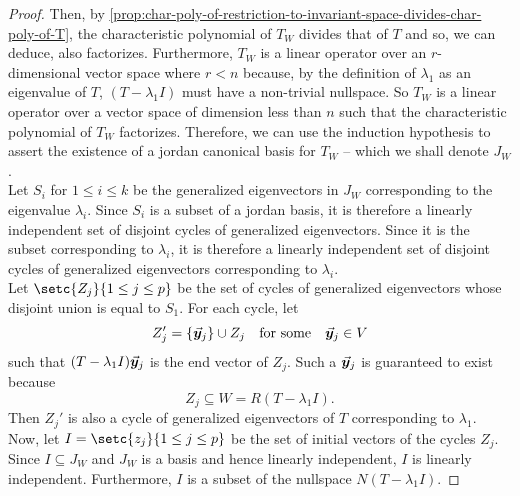 \documentclass[../MathsNotesBase.tex]{subfiles}
\begin{document}
{\begin{proof}
			Then, by \autoref{prop:char-poly-of-restriction-to-invariant-space-divides-char-poly-of-T}, the characteristic polynomial of $T_W$ divides that of $T$ and so, we can deduce, also factorizes. Furthermore, $T_W$ is a linear operator over an $r$-dimensional vector space where ${ r < n }$ because, by the definition of $\lambda_1$ as an eigenvalue of $T$, ${ (T - \lambda_1 I) }$ must have a non-trivial nullspace. So $T_W$ is a linear operator over a vector space of dimension less than $n$ such that the characteristic polynomial of $T_W$ factorizes. Therefore, we can use the induction hypothesis to assert the existence of a jordan canonical basis for $T_W$ -- which we shall denote $J_W$.\\
			
			Let $S_i$ for ${ 1 \leq i \leq k }$ be the generalized eigenvectors in $J_W$ corresponding to the eigenvalue $\lambda_i$. Since $S_i$ is a subset of a jordan basis, it is therefore a linearly independent set of disjoint cycles of generalized eigenvectors. Since it is the subset corresponding to $\lambda_i$, it is therefore a linearly independent set of disjoint cycles of generalized eigenvectors corresponding to $\lambda_i$.\\
			
			Let ${ \setc{Z_j}{1 \leq j \leq p} }$ be the set of cycles of generalized eigenvectors whose disjoint union is equal to $S_1$. For each cycle, let
			\[ Z_j' = \{\vec{\bm{y}}_j\} \cup Z_j \hspace{10pt}\text{for some}\hspace{10pt} \vec{\bm{y}}_j \in V \]
			such that ${ (T - \lambda_1 I)\vec{\bm{y}}_j }$ is the end vector of $Z_j$. Such a $\vec{\bm{y}}_j$ is guaranteed to exist because 
			\[ Z_j \subseteq W = R(T - \lambda_1 I). \]
			Then $Z_j'$ is also a cycle of generalized eigenvectors of $T$ corresponding to $\lambda_1$.\\
			Now, let ${ I = \setc{z_j}{1 \leq j \leq p} }$ be the set of initial vectors of the cycles $Z_j$. Since ${ I \subseteq J_W }$ and $J_W$ is a basis and hence linearly independent, $I$ is linearly independent. Furthermore, $I$ is a subset of the nullspace ${ N(T - \lambda_1 I) }$.
			

\end{proof}}
\end{document}
